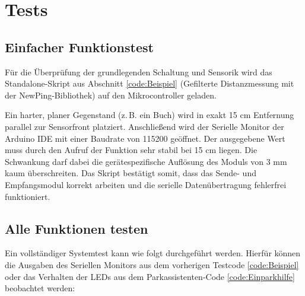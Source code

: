 \begin{center}
	 \label{code:Einparkhilfe}  
\end{center}
\section{Tests}

\subsection{Einfacher Funktionstest}
Für die Überprüfung der grundlegenden Schaltung und Sensorik wird das Standalone-Skript aus Abschnitt \ref{code:Beispiel} (Gefilterte Distanzmessung mit der NewPing-Bibliothek) auf den Mikrocontroller geladen. 

Ein harter, planer Gegenstand (z.\,B. ein Buch) wird in exakt 15 cm Entfernung parallel zur Sensorfront platziert. Anschlie\ss end wird der Serielle Monitor der Arduino IDE mit einer Baudrate von 115200 geöffnet. 
Der ausgegebene Wert muss durch den Aufruf der Funktion  sehr stabil bei 15 cm liegen. Die Schwankung darf dabei die gerätespezifische Auflösung des Moduls von 3 mm \cite{KT:2012} kaum überschreiten. Das Skript bestätigt somit, dass das Sende- und Empfangsmodul korrekt arbeiten und die serielle Datenübertragung fehlerfrei funktioniert.

\subsection{Alle Funktionen testen}
Ein vollständiger Systemtest kann wie folgt durchgeführt werden. Hierfür können die Ausgaben des Seriellen Monitors aus dem vorherigen Testcode \ref{code:Beispiel} oder das Verhalten der LEDs aus dem Parkassistenten-Code \ref{code:Einparkhilfe}  beobachtet werden:

